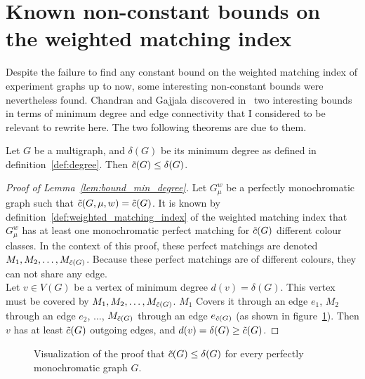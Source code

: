 \section{Known non-constant bounds on the weighted matching index}
\label{sec:known-non-constant-bounds}

Despite the failure to find any constant bound on the weighted matching index of experiment graphs up to now, some interesting non-constant bounds were nevertheless found.
Chandran and Gajjala discovered in~\cite{chandran} two interesting bounds in terms of minimum degree and edge connectivity that I considered to be relevant to rewrite here.
The two following theorems are due to them.

\begin{lemma}
    \label{lem:bound_min_degree}
    Let $G$ be a multigraph, and $\delta(G)$ be its minimum degree as defined in definition~\ref{def:degree}.
    Then $\Tilde{c}(G) \leq \delta(G)$.
\end{lemma}

\begin{proof}[Proof of Lemma~\ref{lem:bound_min_degree}]
    Let $G_\mu^w$ be a perfectly monochromatic graph such that $\Tilde{c}(G, \mu, w) = \Tilde{c}(G)$.
    It is known by definition~\ref{def:weighted_matching_index} of the weighted matching index that $G_\mu^w$ has at least one monochromatic perfect matching for $\Tilde{c}(G)$ different colour classes.
    In the context of this proof, these perfect matchings are denoted $M_1, M_2, \dots, M_{\Tilde{c}(G)}$.
    Because these perfect matchings are of different colours, they can not share any edge.\\
    
    Let $v \in V(G)$ be a vertex of minimum degree $d(v) = \delta(G)$.
    This vertex must be covered by $M_1, M_2, \dots, M_{\Tilde{c}(G)}$.
    $M_1$ Covers it through an edge $e_1$, $M_2$ through an edge $e_2$, $\dots$, $M_{\Tilde{c}(G)}$ through an edge $e_{\Tilde{c}(G)}$ (as shown in figure~\ref{fig:proof_min_degree}).
    Then $v$ has at least $\Tilde{c}(G)$ outgoing edges, and $d(v) = \delta(G) \geq \Tilde{c}(G)$.
\end{proof}

\begin{figure}[H]
    \caption{Visualization of the proof that $\Tilde{c}(G) \leq \delta(G)$ for every perfectly monochromatic graph $G$.}
    \label{fig:proof_min_degree}
\end{figure}

